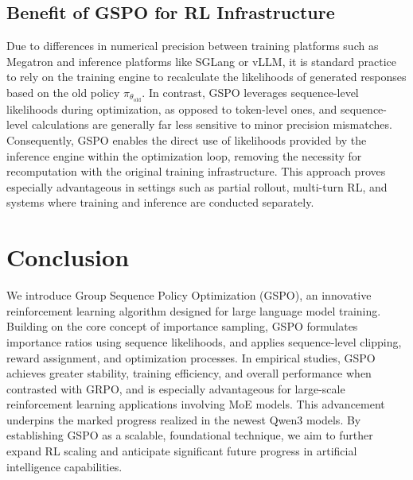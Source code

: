 \subsection{Benefit of GSPO for RL Infrastructure}

Due to differences in numerical precision between training platforms such as Megatron and inference platforms like SGLang or vLLM, it is standard practice to rely on the training engine to recalculate the likelihoods of generated responses based on the old policy $\pi_{\theta_\text{old}}$. In contrast, GSPO leverages sequence-level likelihoods during optimization, as opposed to token-level ones, and sequence-level calculations are generally far less sensitive to minor precision mismatches. Consequently, GSPO enables the direct use of likelihoods provided by the inference engine within the optimization loop, removing the necessity for recomputation with the original training infrastructure. This approach proves especially advantageous in settings such as partial rollout, multi-turn RL, and systems where training and inference are conducted separately.

\section{Conclusion}

We introduce Group Sequence Policy Optimization (GSPO), an innovative reinforcement learning algorithm designed for large language model training. Building on the core concept of importance sampling, GSPO formulates importance ratios using sequence likelihoods, and applies sequence-level clipping, reward assignment, and optimization processes. In empirical studies, GSPO achieves greater stability, training efficiency, and overall performance when contrasted with GRPO, and is especially advantageous for large-scale reinforcement learning applications involving MoE models. This advancement underpins the marked progress realized in the newest Qwen3 models. By establishing GSPO as a scalable, foundational technique, we aim to further expand RL scaling and anticipate significant future progress in artificial intelligence capabilities.

